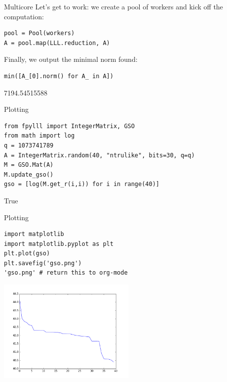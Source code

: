 \documentclass[presentation,smaller]{beamer}
\begin{document}
\begin{frame}[fragile,label={sec:orgheadline12}]{Multicore}
 Let’s get to work: we create a pool of workers and kick off the computation:

\lstset{language=Python,label= ,caption= ,captionpos=b,numbers=none}
\begin{lstlisting}
pool = Pool(workers)
A = pool.map(LLL.reduction, A)
\end{lstlisting}

Finally, we output the minimal norm found:

\lstset{language=Python,label= ,caption= ,captionpos=b,numbers=none}
\begin{lstlisting}
min([A_[0].norm() for A_ in A])
\end{lstlisting}

7194.54515588
\end{frame}

\begin{frame}[fragile,label={sec:orgheadline13}]{Plotting}
 \lstset{language=Python,label= ,caption= ,captionpos=b,numbers=none}
\begin{lstlisting}
from fpylll import IntegerMatrix, GSO
from math import log
q = 1073741789
A = IntegerMatrix.random(40, "ntrulike", bits=30, q=q)
M = GSO.Mat(A)
M.update_gso()
gso = [log(M.get_r(i,i)) for i in range(40)]
\end{lstlisting}

True
\end{frame}

\begin{frame}[fragile,label={sec:orgheadline14}]{Plotting}
 \lstset{language=Python,label= ,caption= ,captionpos=b,numbers=none}
\begin{lstlisting}
import matplotlib
import matplotlib.pyplot as plt
plt.plot(gso)
plt.savefig('gso.png')
'gso.png' # return this to org-mode
\end{lstlisting}

\begin{center}
\includegraphics[width=0.5\textwidth]{gso.png}
\end{center}
\end{frame}
\end{document}
